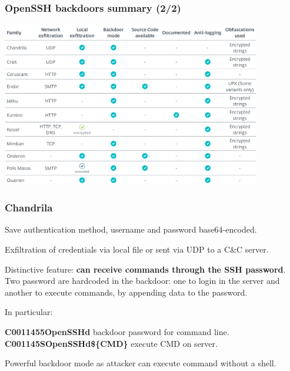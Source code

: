 \begin{frame}
	\frametitle{OpenSSH backdoors summary (2/2)}
	
   \begin{center}    
   \includegraphics[width=0.85\textwidth]{images/families2}
   \end{center}

\end{frame}


\begin{frame}
	\frametitle{Chandrila}
	
	Save authentication method, username and password base64-encoded.
	
	\bigskip
	
	Exfiltration of credentials via local file or sent via UDP to a C\&C server.
	
	\bigskip
	
	Distinctive feature: \textbf{can receive commands through the SSH password}.\\
	Two password are hardcoded in the backdoor: one to login in the server and another to execute commands, by appending data to the password.
	
	\medskip
	
	In particular:
	
	\smallskip
	
	\textbf{C0011455OpenSSHd} backdoor password for command line.
	\textbf{C001145SOpenSSHd\$\{CMD\}} execute CMD on server.

	\bigskip

  Powerful backdoor mode as attacker can execute command without a shell.
  
\end{frame}


